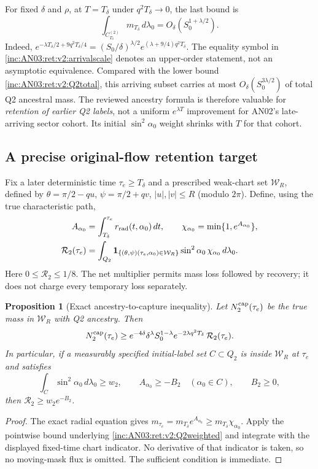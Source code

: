 \documentclass[11pt]{article}
\numberwithin{equation}{section}
\newtheorem{proposition}[theorem]{Proposition}
\theoremstyle{remark}\newtheorem{remark}[theorem]{Remark}
\newcommand{\dd}{\,d}
\newcommand{\1}{\mathbf 1}
\begin{document}
For fixed $\delta$ and $\rho$, at $T=T_\delta$ under
$q^2T_\delta\to0$, the last bound is
\begin{equation}\label{inc:AN03:ret:v2:arrivalscale}
 \int_{C_{T_\delta}^{(2)}}m_{T_\delta}\dd\lambda_0
 =O_\delta(S_0^{1+\lambda/2}).
\end{equation}
Indeed,
$e^{-\lambda T_\delta/2+9q^2T_\delta/4}
=(S_0/\delta)^{\lambda/2}
 e^{(\lambda+9/4)q^2T_\delta}$.
The equality symbol in \eqref{inc:AN03:ret:v2:arrivalscale} denotes an
upper-order statement, not an asymptotic equivalence. Compared with the
lower bound \eqref{inc:AN03:ret:v2:Q2total}, this arriving subset carries
at most $O_\delta(S_0^{3\lambda/2})$ of total Q2 ancestral mass.
The reviewed ancestry formula is therefore valuable for \emph{retention
of earlier Q2 labels}, not a uniform $e^{\lambda T}$ improvement for
AN02's late-arriving sector cohort. Its initial $\sin^2\alpha_0$ weight
shrinks with $T$ for that cohort.

\subsection{A precise original-flow retention target}
Fix a later deterministic time $\tau_e\ge T_\delta$ and a prescribed
weak-chart set $\mathcal W_R$, defined by
$\theta=\pi/2-qu$, $\psi=\pi/2+qv$, $|u|,|v|\le R$ (modulo $2\pi$).
Define, using the true characteristic path,
\begin{align}
 A_{\alpha_0}&=\int_{T_\delta}^{\tau_e}r_{\rm rad}(t,\alpha_0)\dd t,
 \qquad
 \chi_{\alpha_0}=\min\{1,e^{A_{\alpha_0}}\},\nonumber\\
 \mathcal R_2(\tau_e)
 &=\int_{Q_2}\1_{\{(\theta,\psi)(\tau_e,\alpha_0)\in\mathcal W_R\}}
 \sin^2\alpha_0\,\chi_{\alpha_0}\dd\lambda_0.
 \label{inc:AN03:ret:v2:retentionfunctional}
\end{align}
Here $0\le\mathcal R_2\le1/8$. The net multiplier permits mass loss
followed by recovery; it does not charge every temporary loss separately.

\begin{proposition}[Exact ancestry-to-capture inequality]
\label{inc:AN03:ret:v2:retention}
Let $N_2^{\rm cap}(\tau_e)$ be the true mass in $\mathcal W_R$ with Q2
ancestry. Then
\begin{equation}\label{inc:AN03:ret:v2:retentionbound}
 N_2^{\rm cap}(\tau_e)
 \ge e^{-4\delta}\delta^\lambda S_0^{1-\lambda}
 e^{-2\lambda q^2T_\delta}\,\mathcal R_2(\tau_e).
\end{equation}
In particular, if a measurably specified initial-label set $C\subset Q_2$
is inside $\mathcal W_R$ at $\tau_e$ and satisfies
\[
 \int_C\sin^2\alpha_0\dd\lambda_0\ge w_2,
 \qquad A_{\alpha_0}\ge-B_2\quad(\alpha_0\in C),\qquad B_2\ge0,
\]
then $\mathcal R_2\ge w_2e^{-B_2}$.
\end{proposition}
\begin{proof}
The exact radial equation gives
$m_{\tau_e}=m_{T_\delta}e^{A_{\alpha_0}}
\ge m_{T_\delta}\chi_{\alpha_0}$.
Apply the pointwise bound underlying
\eqref{inc:AN03:ret:v2:Q2weighted} and integrate with the displayed
fixed-time chart indicator. No derivative of that indicator is taken,
so no moving-mask flux is omitted. The sufficient condition is immediate.
\end{proof}
\end{document}
